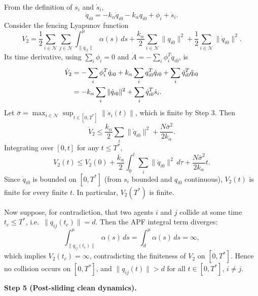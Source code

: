 From the definition of $s_i$ and $\dot{s}_i$,
\begin{equation}
	\ddot{q}_{i0} = -k_\alpha \dot{q}_{i0} - k_\alpha q_{i0} + \phi_i + \dot{s}_i. \label{eq5-3:qddot_transient}
\end{equation}
Consider the fencing Lyapunov function
\begin{equation}
	V_2 = \frac12\sum_{i\in\mathcal{N}}\sum_{j\in\mathcal{N}}
	\int_{\|q_{ij}\|}^{\mu}\alpha(s)\,ds
	+ \frac{k_\alpha}{2}\sum_{i\in\mathcal{N}}\|q_{i0}\|^2
	+ \frac12\sum_{i\in\mathcal{N}}\|\dot{q}_{i0}\|^2. \label{eq5-3:V2}
\end{equation}
Its time derivative, using $\sum_i\phi_i = 0$ and $\dot{A} = -\sum_i\phi_i^T\dot{q}_{i0}$, is
\begin{align}
	\dot{V}_2
	&= -\sum_i\phi_i^T\dot{q}_{i0}
		+ k_\alpha\sum_i q_{i0}^T\dot{q}_{i0}
		+ \sum_i \dot{q}_{i0}^T\ddot{q}_{i0} \notag\\
	&= -k_\alpha\sum_i\|\dot{q}_{i0}\|^2
		+ \sum_i \dot{q}_{i0}^T\dot{s}_i. \label{eq5-3:V2_dot_transient}
\end{align}
Let $\bar\sigma = \max_{i\in\mathcal{N}} \sup_{t\in[0,T^*]} \|\dot{s}_i(t)\|$, which is finite by
Step 3.  Then
\begin{equation}
	\dot{V}_2 \le \frac{k_\alpha}{2}\sum_i\|\dot{q}_{i0}\|^2
		+ \frac{N\bar\sigma^2}{2k_\alpha}. \label{eq5-3:V2_dot_transient_bound}
\end{equation}
Integrating over $[0,t]$ for any $t \le T^*$,
\begin{equation}
	V_2(t) \le V_2(0) + \frac{k_\alpha}{2}\int_0^t \sum_i\|\dot{q}_{i0}\|^2\,d\tau
		+ \frac{N\bar\sigma^2}{2k_\alpha} t. \label{eq5-3:V2_finite}
\end{equation}
Since $\dot{q}_{i0}$ is bounded on $[0,T^*]$ (from $s_i$ bounded and $q_{i0}$ continuous),
$V_2(t)$ is finite for every finite $t$.  In particular, $V_2(T^*)$ is finite.

Now suppose, for contradiction, that two agents $i$ and $j$ collide at some time $t_c \le T^*$,
i.e.~$\|q_{ij}(t_c)\| = d$.  Then the APF integral term diverges:
\begin{equation}
	\int_{\|q_{ij}(t_c)\|}^{\mu}\alpha(s)\,ds
	= \int_{d}^{\mu}\alpha(s)\,ds = \infty,
\end{equation}
which implies $V_2(t_c) = \infty$, contradicting the finiteness of $V_2$ on $[0,T^*]$.
Hence no collision occurs on $[0,T^*]$, and $\|q_{ij}(t)\| > d$ for all $t \in [0,T^*]$,
$i \neq j$.

\medskip\noindent\textbf{Step 5 (Post-sliding clean dynamics).}

